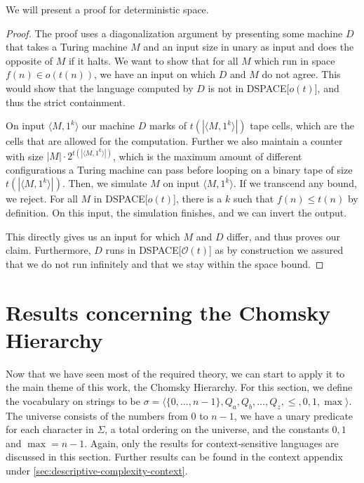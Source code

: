 We will present a proof for deterministic space.
\begin{proof}
    The proof uses a diagonalization argument by presenting some machine $D$ that takes a Turing machine $M$ and an input size in unary as input and does the opposite of $M$ if it halts.
    We want to show that for all $M$ which run in space $f(n) \in o(t(n))$, we have an input on which $D$ and $M$ do not agree.
    This would show that the language computed by $D$ is not in DSPACE[$o(t)$], and thus the strict containment.

    On input $\langle M, 1^{k} \rangle$ our machine $D$ marks of $t(|\langle M, 1^{k} \rangle|)$ tape cells, which are the cells that are allowed for the computation.
    Further we also maintain a counter with size $|M|\cdot 2^{t(|\langle M, 1^{k} \rangle|)}$, which is the maximum amount of different configurations a Turing machine can pass before looping on a binary tape of size $t(|\langle M, 1^{k} \rangle|)$.
    Then, we simulate $M$ on input $\langle M, 1^{k} \rangle$.
    If we transcend any bound, we reject.
    For all $M$ in DSPACE[$o(t)$], there is a $k$ such that $f(n) \leq t(n)$ by definition.
    On this input, the simulation finishes, and we can invert the output.

    This directly gives us an input for which $M$ and $D$ differ, and thus proves our claim.
    Furthermore, $D$ runs in DSPACE[$\mathcal{O}(t)$] as by construction we assured that we do not run infinitely and that we stay within the space bound.
\end{proof}


\section{Results concerning the Chomsky Hierarchy}\label{sec:results-concerning-the-chomsky-hierarchy}

Now that we have seen most of the required theory, we can start to apply it to the main theme of this work, the Chomsky Hierarchy.
For this section, we define the vocabulary on strings to be $\sigma = \langle \{0, \dots, n - 1\}, Q_a, Q_b, \dots, Q_z, \leq , 0, 1, \max \rangle$.
The universe consists of the numbers from $0$ to $n - 1$, we have a unary predicate for each character in $\Sigma$, a total ordering on the universe, and the constants $0, 1$ and $\max = n - 1$.
Again, only the results for context-sensitive languages are discussed in this section.
Further results can be found in the context appendix under \cref{sec:descriptive-complexity-context}.

